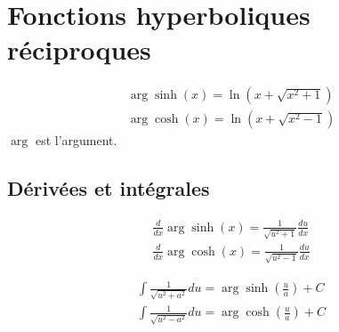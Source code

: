 \section{Fonctions hyperboliques réciproques}
\begin{eqnarray}
	\arg\sinh{(x)}=\ln{(x+\sqrt{x^2+1})}\\
	\arg\cosh{(x)}=\ln{(x+\sqrt{x^2-1})}
\end{eqnarray}
$\arg$ est l'argument.
\subsection{Dérivées et intégrales}
\begin{eqnarray}
	\frac{d}{dx}\arg\sinh{(x)}=\frac{1}{\sqrt{u^2+1}}\frac{du}{dx}\\
	\frac{d}{dx}\arg\cosh{(x)}=\frac{1}{\sqrt{u^2-1}}\frac{du}{dx}
\end{eqnarray}

\begin{eqnarray}
	\int\frac{1}{\sqrt{u^2+a^2}}du=\arg\sinh{\left(\frac{u}{a}\right)}+C\\
	\int\frac{1}{\sqrt{u^2-a^2}}du=\arg\cosh{\left(\frac{u}{a}\right)}+C
\end{eqnarray}